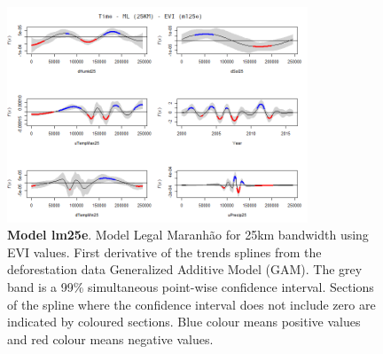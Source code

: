 \begin{table}
\begin{figure}[H]
 \centering
        \centering
        \includegraphics[width=0.8\textwidth]{ml25e.png} %
        \caption[Model Legal Maranhão for 25km bandwidth using EVI values. First derivative of the trends splines from the deforestation data Generalized Additive Model (GAM)]{\textbf{Model lm25e}. Model Legal Maranhão for 25km bandwidth using EVI values. First derivative of the trends splines from the deforestation data Generalized Additive Model (GAM). The grey band is a 99\% simultaneous point-wise confidence interval. Sections of the spline where the confidence interval does not include zero are indicated by coloured sections. Blue colour means positive values and red colour means negative values.}
        \centering
\end{figure}
\end{table}


